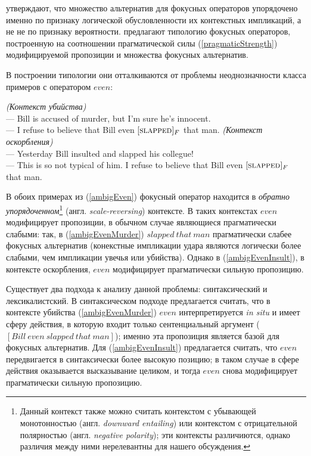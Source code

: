 \documentclass[a4paper, titlepage]{article}
\begin{document}
\medskip

\citep{gast2011scalar} утверждают, что множество альтернатив для фокусных операторов упорядочено именно по признаку логической обусловленности их контекстных импликаций, а не не по признаку вероятности. \citep{gast2011scalar} предлагают типологию фокусных операторов, построенную на соотношении прагматической силы (\ref{pragmaticStrength}) модифицируемой пропозиции и множества фокусных альтернатив.

\medskip

В построении типологии они отталкиваются от проблемы неоднозначности класса примеров с оператором $ even $:

\begin{exe}
    \ex \label{ambigEven} \begin{xlist}
    \ex \label{ambigEvenMurder} \textit{(Контекст убийства)} \\
    --- Bill is accused of murder, but I’m sure he’s innocent. \\
    --- I refuse to believe that Bill even $ [\textsc{slapped}]_F $ that man.
    \ex \label{ambigEvenInsult} \textit{(Контекст оскорбления)} \\
    --- Yesterday Bill insulted and slapped his collegue! \\
    --- This is so not typical of him. I refuse to believe that Bill even $ [\textsc{slapped}]_F $ that man.
    \end{xlist}
\end{exe}

В обоих примерах из (\ref{ambigEven}) фокусный оператор находится в \textit{обратно упорядоченном}\footnote{Данный контекст также можно считать контекстом с убывающей монотонностью (англ. \textit{downward entailing}) или контекстом с отрицательной полярностью (англ. \textit{negative polarity}); эти контексты различиются, однако различия между ними нерелевантны для нашего обсуждения.} (англ. \textit{scale-reversing}) контексте. В таких контекстах $ even $  модифицирует пропозиции, в обычном случае являющиеся прагматически слабыми: так, в (\ref{ambigEvenMurder}) $ slapped\ that\ man $ прагматически слабее фокусных альтернатив (конекстные импликации удара являются логически более слабыми, чем импликации увечья или убийства). Однако в (\ref{ambigEvenInsult}), в контексте оскорбления, $ even $ модифицирует прагматически сильную пропозицию.

\medskip

Существует два подхода к анализу данной проблемы: синтаксический и лексикалистский. В синтаксическом подходе предлагается считать, что в контексте убийства (\ref{ambigEvenMurder}) $ even $ интерпретируется \textit{in situ} и имеет сферу действия, в которую входит только сентенциальный аргумент ($[Bill\ even\ slapped\ that\ man] $); именно эта пропозиция является базой для фокусных альтернатив. Для (\ref{ambigEvenInsult}) предлагается считать, что $ even $ передвигается в синтаксически более высокую позицию; в таком случае в сфере действия оказывается высказывание целиком, и тогда $ even $ снова модифицирует прагматически сильную пропозицию.
\end{document}
